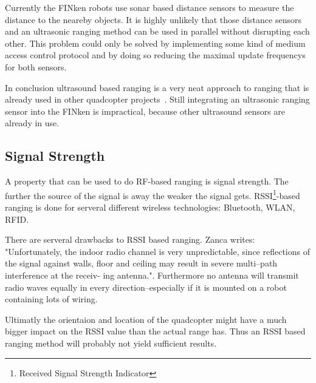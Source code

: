 Currently the FINken robots use sonar based distance sensors to measure the distance to the neareby objects.
It is highly unlikely that those distance sensors and an ultrasonic ranging method can be used in parallel without disrupting each other.
This problem could only be solved by implementing some kind of medium access control protocol and by doing so reducing the maximal update frequencys for both sensors.


In conclusion ultrasound based ranging is a very neat approach to ranging that is already used in other quadcopter projects~\cite{ultrasonic_erlangen}.
Still integrating an ultrasonic ranging sensor into the FINken is impractical, because other ultrasound sensors are already in use.


\subsection{Signal Strength}

A property that can be used to do RF-based ranging is signal strength.
The further the source of the signal is away the weaker the signal gets.
RSSI\footnote{Received Signal Strength Indicator}-based ranging is done for serveral different wireless technologies: Bluetooth\cite{pei_using_2010}, WLAN\cite{wlanrssi, wlanrssi2}, RFID\cite{rfidrssi}.

There are serveral drawbacks to RSSI based ranging. Zanca \cite{Zanca} writes: "Unfortunately, the indoor radio channel is very
unpredictable, since reflections of the signal against walls, floor and ceiling may result in severe multi–path interference at the receiv-
ing antenna.".
Furthermore no antenna will transmit radio waves equally in every direction–especially if it is mounted on a robot containing lots of wiring.

Ultimatly the orientaion and location of the quadcopter might have a much bigger impact on the RSSI value than the actual range has.
Thus an RSSI based ranging method will probably not yield sufficient results.


